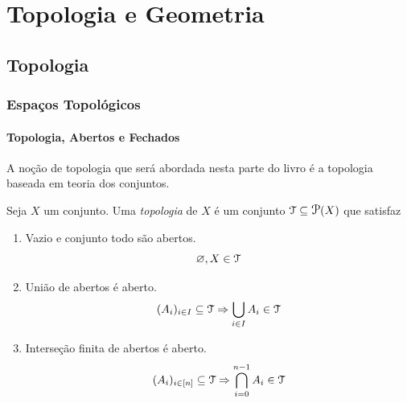 \part{Topologia e Geometria}

\chapter{Topologia}

\section{Espaços Topológicos}

\subsection{Topologia, Abertos e Fechados}

A noção de topologia que será abordada nesta parte do livro é a topologia baseada em teoria dos conjuntos.

\begin{defi}
	Seja $X$ um conjunto. Uma \emph{topologia} de $X$ é um conjunto $\topo \subseteq \p(X)$ que satisfaz
	\begin{enumerate}
	\item Vazio e conjunto todo são abertos.
	\begin{equation*}
	\varnothing, X \in \mathcal{T}
	\end{equation*}

	\item União de abertos é aberto.
	\begin{equation*}
	(A_i)_{i \in I} \subseteq \mathcal{T} \Rightarrow \displaystyle\bigcup_{i \in I} A_i \in \mathcal{T}
	\end{equation*}

	\item Interseção finita de abertos é aberto.
	\begin{equation*}
	(A_i)_{i \in [n]} \subseteq \mathcal T \Rightarrow \displaystyle\bigcap_{i=0}^{n-1} A_i \in \mathcal{T}
	\end{equation*}
	\end{enumerate}
\end{defi}

